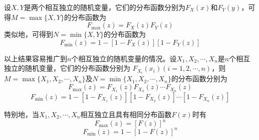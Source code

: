 \begin{definition}[$M=\max\{X,Y\}$分布及$N=\min\{X,Y\}$分布]
    设$X,Y$是两个相互独立的随机变量，它们的分布函数分别为$F_X(x)$和$F_Y(y)$，可得$M=\max\{X,Y\}$的分布函数为
    $$F_{\max}(z)=F_X(z)F_Y(z)$$
    类似地，可得到$N=\min\{X,Y\}$的分布函数为
    $$F_{\min}(z)=1-[1-F_X(z)][1-F_Y(z)]$$

    以上结果容易推广到$n$个相互独立的随机变量的情况。设$X_1,X_2,\cdots,X_n$是$n$个相互独立的随机变量，它们的分布函数分别为
    $F_{X_i}(x_i)(i=1,2,\cdots,n)$，则$M=\max\{X_1,X_2,\cdots,X_n\}$及$N=\min\{X_1,X_2,\cdots,X_n\}$的分布函数分别为
    $$F_{\max}(z)=F_{X_1}(z)F_{X_2}(z)\cdots F_{X_n}(z)$$
    $$F_{\min}(z)=1-[1-F_{X_1}(z)][1-F_{X_2}(z)]\cdots [1-F_{X_n}(z)]$$

    特别地，当$X_1,X_2,\cdots,X_n$相互独立且具有相同分布函数$F(x)$时有
    $$F_{\max}(z)=[F(z)]^n$$
    $$F_{\min}(z)=1-[1-F(z)]^n$$
\end{definition}
